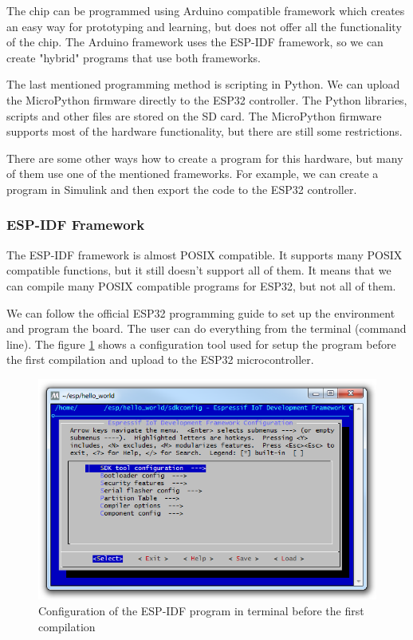 The chip can be programmed using Arduino compatible framework \cite{espressif:ArduinoCore} which creates an easy way for prototyping and learning, but does not offer all the functionality of the chip. The Arduino framework uses the \ac{ESP-IDF} framework, so we can create "hybrid" programs that use both frameworks.

The last mentioned programming method is scripting in Python. We can upload the MicroPython \cite{MicroPython} firmware directly to the ESP32 controller. The Python libraries, scripts and other files are stored on the SD card. The MicroPython firmware supports most of the hardware functionality, but there are still some restrictions.

There are some other ways how to create a program for this hardware, but many of them use one of the mentioned frameworks. For example, we can create a program in Simulink and then export the code to the ESP32 controller. \cite{ArduinoSimulink}

\subsubsection{\ac{ESP-IDF} Framework}
The \ac{ESP-IDF} framework is almost \ac{POSIX} compatible. \cite{ESP32posix} It supports many \ac{POSIX} compatible functions, but it still doesn't support all of them. It means that we can compile many \ac{POSIX} compatible programs for ESP32, but not all of them.

We can follow the official ESP32 programming guide \cite{ESP32programmingGuide} to set up the environment and program the board. The user can do everything from the terminal (command line). The figure \ref{ESP32menuconfig} shows a configuration tool used for setup the program before the first compilation and upload to the ESP32 microcontroller.

\begin{figure}
	\centering
	\label{ESP32menuconfig}
	\caption{Configuration of the \ac{ESP-IDF} program in terminal before the first compilation}
	\includegraphics[width=\linewidth]{img/ESP32menuconfig.png}
\end{figure}

